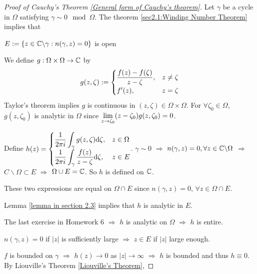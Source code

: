 \begin{proof}[Proof of Cauchy's Theorem \ref{General form of Cauchy's theorem}]
    Let  $ \gamma  $ be a cycle in  $ \Omega $ satisfying  $ \gamma\sim 0 \mod \Omega$. The theorem  \ref{sec2.1:Winding Number Theorem} implies that 
    \begin{center}
         $ E:=\{z\in \mathbb C\backslash\gamma:n(\gamma,z)=0\} $ is open 
    \end{center} 
    We define  $ g :\Omega\times\Omega\rightarrow \mathbb C$ by 
    \begin{equation}\label{sec4.3:g def}
        g(z,\zeta):=\begin{cases}
            \displaystyle\frac{f(z)-f(\zeta)}{z-\zeta},&z\neq \zeta \\
            f'(z),&z=\zeta
        \end{cases}
    \end{equation}  
    Taylor's theorem implies  $ g $ is continuous in  $ (z,\zeta)\in \Omega\times\Omega $. For  $ \forall \zeta_0\in \Omega $,  $ g(z,\zeta_0) $ is analytic in  $ \Omega $ since  $ \displaystyle\lim_{z\to\zeta_0}(z-\zeta_0)g(z,\zeta_0)=0$.
    
    Define  $ h(z)=\begin{cases}
        \displaystyle\frac{1}{2\pi i}\int_\gamma g(z,\zeta)\mathrm{d} \zeta,&z\in \Omega\\
        \displaystyle\frac{1}{2\pi i}\int_\gamma\frac{f(z)}{z-\zeta}\mathrm{d} \zeta,&z\in E
    \end{cases} $. 
     $ \gamma\sim 0 $ $ \Rightarrow  $  $ n(\gamma,z)=0,\forall z\in \mathbb C\backslash \Omega $ $ \Rightarrow  $ $ C\backslash \Omega\subset E $ $ \Rightarrow  $ $ \Omega\cup E=\mathbb C $. So  $ h $ is defined on  $ \mathbb C $.
     
     These two expressions are equal on  $ \Omega\cap E $ since  $ n(\gamma,z)=0 $, $ \forall z\in \Omega\cap E $.
     
    Lemma \ref{lemma in section 2.3} implies that  $ h $ is analytic in  $ E $.
    
    The last exercise in Homework 6 $ \Rightarrow $  $ h $  is analytic on  $ \Omega $ $ \Rightarrow $  $ h $ is entire.
    
     $ n(\gamma,z)=0 $ if  $ |z| $ is sufficiently large  $ \Rightarrow  $   $ z\in E $ if  $ |z| $ large enough.
     
      $ f $ is bounded on  $ \gamma $ $ \Rightarrow  $ $ h(z)\rightarrow 0 $ as  $ |z|\rightarrow\infty $ $ \Rightarrow $  $ h $ is bounded and thus  $ h\equiv 0 $. By Liouville's Theorem \ref{Liouville's Theorem}, 
      

\end{proof}
